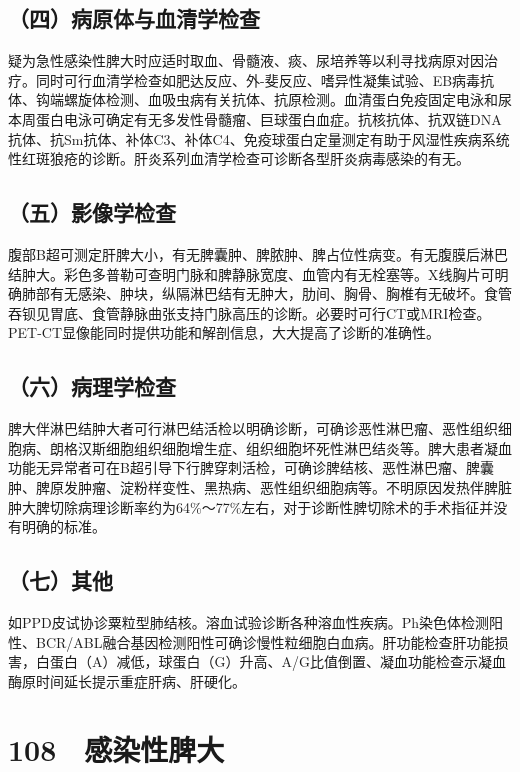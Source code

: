 \subsection{（四）病原体与血清学检查}

疑为急性感染性脾大时应适时取血、骨髓液、痰、尿培养等以利寻找病原对因治疗。同时可行血清学检查如肥达反应、外-斐反应、嗜异性凝集试验、EB病毒抗体、钩端螺旋体检测、血吸虫病有关抗体、抗原检测。血清蛋白免疫固定电泳和尿本周蛋白电泳可确定有无多发性骨髓瘤、巨球蛋白血症。抗核抗体、抗双链DNA抗体、抗Sm抗体、补体C3、补体C4、免疫球蛋白定量测定有助于风湿性疾病系统性红斑狼疮的诊断。肝炎系列血清学检查可诊断各型肝炎病毒感染的有无。

\subsection{（五）影像学检查}

腹部B超可测定肝脾大小，有无脾囊肿、脾脓肿、脾占位性病变。有无腹膜后淋巴结肿大。彩色多普勒可查明门脉和脾静脉宽度、血管内有无栓塞等。X线胸片可明确肺部有无感染、肿块，纵隔淋巴结有无肿大，肋间、胸骨、胸椎有无破坏。食管吞钡见胃底、食管静脉曲张支持门脉高压的诊断。必要时可行CT或MRI检查。PET-CT显像能同时提供功能和解剖信息，大大提高了诊断的准确性。

\subsection{（六）病理学检查}

脾大伴淋巴结肿大者可行淋巴结活检以明确诊断，可确诊恶性淋巴瘤、恶性组织细胞病、朗格汉斯细胞组织细胞增生症、组织细胞坏死性淋巴结炎等。脾大患者凝血功能无异常者可在B超引导下行脾穿刺活检，可确诊脾结核、恶性淋巴瘤、脾囊肿、脾原发肿瘤、淀粉样变性、黑热病、恶性组织细胞病等。不明原因发热伴脾脏肿大脾切除病理诊断率约为64\%～77\%左右，对于诊断性脾切除术的手术指征并没有明确的标准。

\subsection{（七）其他}

如PPD皮试协诊粟粒型肺结核。溶血试验诊断各种溶血性疾病。Ph染色体检测阳性、BCR/ABL融合基因检测阳性可确诊慢性粒细胞白血病。肝功能检查肝功能损害，白蛋白（A）减低，球蛋白（G）升高、A/G比值倒置、凝血功能检查示凝血酶原时间延长提示重症肝病、肝硬化。

\protect\hypertarget{text00245.html}{}{}

\section{108　感染性脾大}

